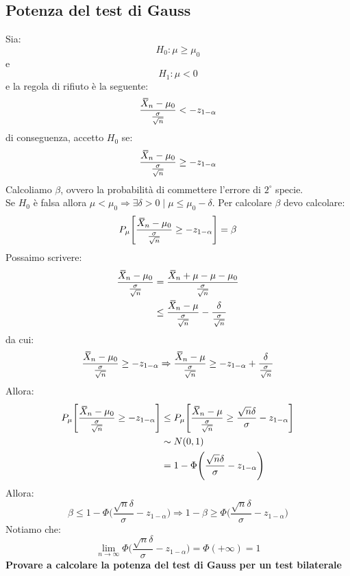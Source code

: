 \documentclass[12pt]{report}
\newcommand{\wbar}[1]{%
	\accentset{\mbox{\rule{0.55em}{0.5pt}}}{#1}%
}
\begin{document}
		\subsection{Potenza del test di Gauss}
		Sia:
		\[
		H_0: \mu \geq \mu_0
		\]
		e
		\[
		H_1: \mu < 0
		\]
		e la regola di rifiuto è la seguente:
		\[
		\frac{\wbar{X}_n - \mu_0}{\frac{\sigma}{\sqrt{n}}} < -z_{1 - \alpha}
		\]
		di conseguenza, accetto $H_0$ se:
		\[
		\frac{\wbar{X}_n - \mu_0}{\frac{\sigma}{\sqrt{n}}} \geq -z_{1 - \alpha}
		\]
		Calcoliamo $\beta$, ovvero la probabilità di commettere l'errore di $2^\circ$ specie. \\
		Se $H_0$ è falsa allora $\mu < \mu_0 \Rightarrow \exists \delta > 0 \mid \mu \leq \mu_0 - \delta$. Per calcolare $\beta$ devo calcolare:
		\begin{align*}
			P_\mu\Bigg[\frac{\wbar{X}_n - \mu_0}{\frac{\sigma}{\sqrt{n}}} \geq -z_{1 - \alpha}\Bigg] = \beta
		\end{align*}
		Possaimo scrivere:
		\begin{align*}
			\frac{\wbar{X}_n - \mu_0}{\frac{\sigma}{\sqrt{n}}} &= \frac{\wbar{X}_n + \mu - \mu - \mu_0}{\frac{\sigma}{\sqrt{n}}} \\
			&\leq \frac{\wbar{X}_n - \mu}{\frac{\sigma}{\sqrt{n}}} - \frac{\delta}{\frac{\sigma}{\sqrt{n}}}
		\end{align*}
		da cui:
		\begin{align*}
			\frac{\wbar{X}_n - \mu_0}{\frac{\sigma}{\sqrt{n}}} \geq -z_{1 - \alpha} \Rightarrow \frac{\wbar{X}_n - \mu}{\frac{\sigma}{\sqrt{n}}} \geq -z_{1-\alpha} +  \frac{\delta}{\frac{\sigma}{\sqrt{n}}}
		\end{align*}
		Allora:
		\begin{align*}
			P_\mu\Bigg[\frac{\wbar{X}_n - \mu_0}{\frac{\sigma}{\sqrt{n}}} \geq -z_{1 - \alpha}\Bigg] &\leq P_\mu\Bigg[\frac{\wbar{X}_n - \mu}{\frac{\sigma}{\sqrt{n}}} \geq \frac{\sqrt{n}\delta}{\sigma} - z_{1-\alpha}\Bigg] \\
			&\sim N(0, 1) \\
			&= 1 - \Phi\Bigg(\frac{\sqrt{n}\delta}{\sigma} - z_{1-\alpha}\Bigg)
 		\end{align*}
 		Allora:
 		\[
 		\beta \leq 1 - \Phi\Bigg(\frac{\sqrt{n}\delta}{\sigma} - z_{1-\alpha}\Bigg) \Rightarrow 1- \beta \geq \Phi\Bigg(\frac{\sqrt{n}\delta}{\sigma} - z_{1-\alpha}\Bigg)
 		\]
 		Notiamo che:
 		\[
 		\lim\limits_{n\to\infty}\Phi\Bigg(\frac{\sqrt{n}\delta}{\sigma} - z_{1-\alpha}\Bigg) = \Phi(+\infty) = 1
 		\]
 		\textbf{Provare a calcolare la potenza del test di Gauss per un test bilaterale}
\end{document}
